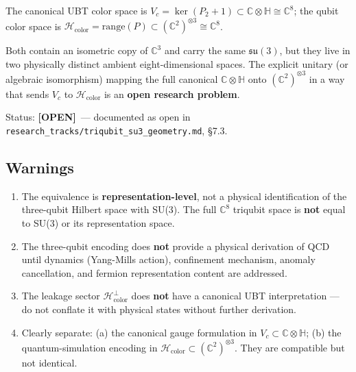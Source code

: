\documentclass[11pt,a4paper]{article}
\newcommand{\C}{\mathbb{C}}
\newcommand{\H}{\mathbb{H}}
\newcommand{\OPEN}{\textbf{[OPEN]}}
\begin{document}
\begin{tcolorbox}[colback=orange!10!white,colframe=orange!75!black,
  title=Open problem: bridge between the two $\C^8$ spaces]
The canonical UBT color space is $V_c = \ker(P_2+1) \subset \C\otimes\H \cong
\C^8$; the qubit color space is $\mathcal{H}_{\mathrm{color}} = \mathrm{range}(P)
\subset (\C^2)^{\otimes 3} \cong \C^8$.

Both contain an isometric copy of $\C^3$ and carry the same $\mathfrak{su}(3)$,
but they live in two physically distinct ambient eight-dimensional spaces.  The
explicit unitary (or algebraic isomorphism) mapping the full canonical $\C\otimes\H$
onto $(\C^2)^{\otimes 3}$ in a way that sends $V_c$ to $\mathcal{H}_{\mathrm{color}}$
is an \textbf{open research problem}.

Status: \OPEN\ — documented as open in
\texttt{research\_tracks/triqubit\_su3\_geometry.md}, \S7.3.
\end{tcolorbox}

\subsection{Warnings}
\label{sec:bridges:su3_gauge_qubit:warnings}

\begin{tcolorbox}[colback=red!5!white,colframe=red!40!black,title=Warnings]
\begin{enumerate}
  \item The equivalence is \textbf{representation-level}, not a physical
        identification of the three-qubit Hilbert space with SU(3).  The full
        $\C^8$ triqubit space is \textbf{not} equal to SU(3) or its
        representation space.
  \item The three-qubit encoding does \textbf{not} provide a physical derivation
        of QCD until dynamics (Yang-Mills action), confinement mechanism, anomaly
        cancellation, and fermion representation content are addressed.
  \item The leakage sector $\mathcal{H}_{\mathrm{color}}^\perp$ does
        \textbf{not} have a canonical UBT interpretation — do not conflate it
        with physical states without further derivation.
  \item Clearly separate: (a) the canonical gauge formulation in
        $V_c \subset \C\otimes\H$; (b) the quantum-simulation encoding in
        $\mathcal{H}_{\mathrm{color}} \subset (\C^2)^{\otimes 3}$.
        They are compatible but not identical.
\end{enumerate}
\end{tcolorbox}
\end{document}
